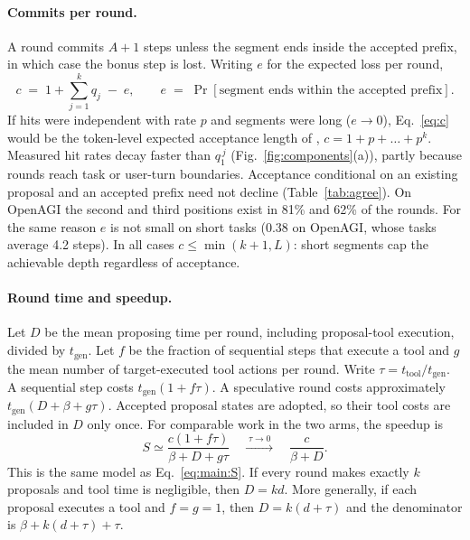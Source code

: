 \paragraph{Commits per round.}
A round commits $A{+}1$ steps unless the segment ends inside the accepted
prefix, in which case the bonus step is lost. Writing $e$ for the expected loss
per round,
\begin{equation}
  c \;=\; 1 + \sum_{j=1}^{k} q_j \;-\; e,
  \qquad e \;=\; \Pr[\text{segment ends within the accepted prefix}].
  \label{eq:c}
\end{equation}
If hits were independent with rate $p$ and segments were long ($e \to 0$),
Eq.~\ref{eq:c} would be the token-level expected acceptance length of
\citet{leviathan2023}, $c = 1 + p + \dots + p^{k}$. Measured hit rates decay
faster than $q_1^{\,j}$ (Fig.~\ref{fig:components}(a)), partly because rounds
reach task or user-turn boundaries. Acceptance conditional on an existing proposal and an accepted
prefix need not decline (Table~\ref{tab:agree}). On OpenAGI the second and third positions exist in
81\% and 62\% of the rounds. For the same reason $e$ is not small on short
tasks (0.38 on OpenAGI, whose tasks average 4.2 steps). In all cases
$c \le \min(k{+}1, L)$: short segments cap the achievable depth regardless of
acceptance.

\paragraph{Round time and speedup.}
Let $D$ be the mean proposing time per round, including proposal-tool execution, divided by
$t_{\mathrm{gen}}$. Let $f$ be the fraction of sequential steps that execute a tool and $g$ the
mean number of target-executed tool actions per round. Write $\tau=t_{\mathrm{tool}}/t_{\mathrm{gen}}$.
A sequential step costs $t_{\mathrm{gen}}(1+f\tau)$. A speculative round costs approximately
$t_{\mathrm{gen}}(D+\beta+g\tau)$. Accepted proposal states are adopted, so their tool costs are
included in $D$ only once. For comparable work in the two arms, the speedup is
\begin{equation}
 S\simeq\frac{c(1+f\tau)}{\beta+D+g\tau}
 \quad\xrightarrow{\;\tau\to0\;}\quad\frac{c}{\beta+D}.
 \label{eq:S}
\end{equation}
This is the same model as Eq.~\ref{eq:main:S}. If every round makes exactly $k$ proposals and
tool time is negligible, then $D=kd$. More generally, if each proposal executes a tool and
$f=g=1$, then $D=k(d+\tau)$ and the denominator is $\beta+k(d+\tau)+\tau$.

